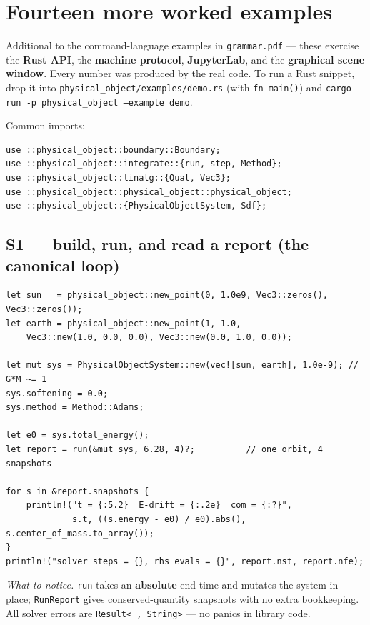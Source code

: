 \documentclass[11pt]{article}
\newcommand{\code}[1]{\texttt{#1}}
\begin{document}
\section{Fourteen more worked examples}

Additional to the command-language examples in \code{grammar.pdf}
--- these exercise the \textbf{Rust API}, the \textbf{machine protocol},
\textbf{JupyterLab}, and the \textbf{graphical scene window}. Every number was produced by the real code. To
run a Rust snippet, drop it into
\code{physical\_object/examples/demo.rs} (with \code{fn main()}) and
\code{cargo run -p physical\_object --example demo}.

Common imports:
\begin{lstlisting}[language=RustLite]
use ::physical_object::boundary::Boundary;
use ::physical_object::integrate::{run, step, Method};
use ::physical_object::linalg::{Quat, Vec3};
use ::physical_object::physical_object::physical_object;
use ::physical_object::{PhysicalObjectSystem, Sdf};
\end{lstlisting}

\subsection{S1 --- build, run, and read a report (the canonical loop)}

\begin{lstlisting}[language=RustLite]
let sun   = physical_object::new_point(0, 1.0e9, Vec3::zeros(), Vec3::zeros());
let earth = physical_object::new_point(1, 1.0,
    Vec3::new(1.0, 0.0, 0.0), Vec3::new(0.0, 1.0, 0.0));

let mut sys = PhysicalObjectSystem::new(vec![sun, earth], 1.0e-9); // G*M ~= 1
sys.softening = 0.0;
sys.method = Method::Adams;

let e0 = sys.total_energy();
let report = run(&mut sys, 6.28, 4)?;          // one orbit, 4 snapshots

for s in &report.snapshots {
    println!("t = {:5.2}  E-drift = {:.2e}  com = {:?}",
             s.t, ((s.energy - e0) / e0).abs(), s.center_of_mass.to_array());
}
println!("solver steps = {}, rhs evals = {}", report.nst, report.nfe);
\end{lstlisting}

\emph{What to notice.} \code{run} takes an \textbf{absolute} end time
and mutates the system in place; \code{RunReport} gives
conserved-quantity snapshots with no extra bookkeeping. All solver
errors are \code{Result<\_, String>} --- no panics in library code.
\end{document}
